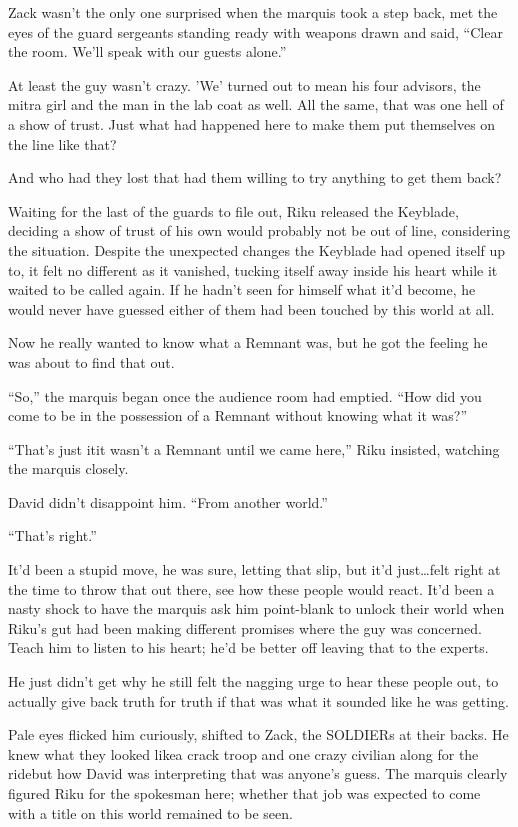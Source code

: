 Zack wasn't the only one surprised when the marquis took a step back, met the eyes of the guard sergeants standing ready with weapons drawn and said, ``Clear the room. We'll speak with our guests alone.''

At least the guy wasn't crazy. 'We' turned out to mean his four advisors, the mitra girl and the man in the lab coat as well. All the same, that was one hell of a show of trust. Just what had happened here to make them put themselves on the line like that?

And who had they lost that had them willing to try anything to get them back?


\scenechange


Waiting for the last of the guards to file out, Riku released the Keyblade, deciding a show of trust of his own would probably not be out of line, considering the situation. Despite the unexpected changes the Keyblade had opened itself up to, it felt no different as it vanished, tucking itself away inside his heart while it waited to be called again. If he hadn't seen for himself what it'd become, he would never have guessed either of them had been touched by this world at all.

Now he really wanted to know what a Remnant was, but he got the feeling he was about to find that out.

``So,'' the marquis began once the audience room had emptied. ``How did you come to be in the possession of a Remnant without knowing what it was?''

``That's just it\textemdash it wasn't a Remnant until we came here,'' Riku insisted, watching the marquis closely.

David didn't disappoint him. ``From another world.''

``That's right.''

It'd been a stupid move, he was sure, letting that slip, but it'd just\ldots felt right at the time to throw that out there, see how these people would react. It'd been a nasty shock to have the marquis ask him point-blank to unlock their world when Riku's gut had been making different promises where the guy was concerned. Teach him to listen to his heart; he'd be better off leaving that to the experts.

He just didn't get why he still felt the nagging urge to hear these people out, to actually give back truth for truth if that was what it sounded like he was getting.

Pale eyes flicked him curiously, shifted to Zack, the SOLDIERs at their backs. He knew what they looked like\textemdash a crack troop and one crazy civilian along for the ride\textemdash but how David was interpreting that was anyone's guess. The marquis clearly figured Riku for the spokesman here; whether that job was expected to come with a title on this world remained to be seen.

